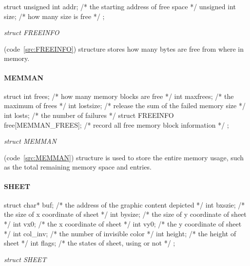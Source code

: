 \documentclass{swfcthesis}
\begin{document}
\begin{listing}[H]
  \begin{codeblock}
\begin{ccode}
struct 
{ 
  unsigned int addr; /* the starting address of free space */
  unsigned int size; /* how many size is free */
};
\end{ccode}
  \end{codeblock}
  \caption{\emph{struct FREEINFO}}\label{src:FREEINFO}
\end{listing}

(code~\ref{src:FREEINFO}) structure stores how many bytes are
free from where in memory.




\paragraph{MEMMAN}

\begin{listing}[H]
  \begin{codeblock}
\begin{ccode}
struct 
{ 
  int frees;                           /* how many memory blocks are free */
  int maxfrees;                        /* the maximum of frees */
  int lostsize;                        /* release the sum of the failed memory size */
  int losts;                           /* the number of failures */
  struct FREEINFO free[MEMMAN_FREES];  /* record all free memory block information */
};
\end{ccode}
  \end{codeblock}
  \caption{\emph{struct MEMMAN}}\label{src:MEMMAN}
\end{listing}

(code~\ref{src:MEMMAN}) structure is used to store the entire memory usage, such as the total
remaining memory space and entries.



\paragraph{SHEET}

\begin{listing}[H]
  \begin{codeblock}
\begin{ccode}
struct 
{ 
  char* buf;   /* the address of the graphic content depicted */
  int bxszie;  /* the size of x coordinate of sheet */
  int bysize;  /* the size of y coordinate of sheet */
  int vx0;     /* the x coordinate of sheet */
  int vy0;     /* the y coordinate of sheet */
  int col_inv; /* the number of invisible color */
  int height;  /* the height of sheet */
  int flags;   /* the states of sheet, using or not */
};
\end{ccode}
  \end{codeblock}
  \caption{\emph{struct SHEET}}\label{src:SHEET}
\end{listing}
\end{document}
